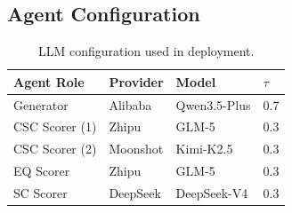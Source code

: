 \documentclass[sigconf]{acmart}
\begin{document}
\subsection{Agent Configuration}

\begin{table}[h]
\caption{LLM configuration used in deployment.}
\centering
\begin{tabular}{l l l l}
\toprule
Agent Role & Provider & Model & $\tau$ \\
\midrule
Generator & Alibaba & Qwen3.5-Plus & 0.7 \\
CSC Scorer (1) & Zhipu & GLM-5 & 0.3 \\
CSC Scorer (2) & Moonshot & Kimi-K2.5 & 0.3 \\
EQ Scorer & Zhipu & GLM-5 & 0.3 \\
SC Scorer & DeepSeek & DeepSeek-V4 & 0.3 \\
\bottomrule
\end{tabular}
\end{table}
\end{document}
